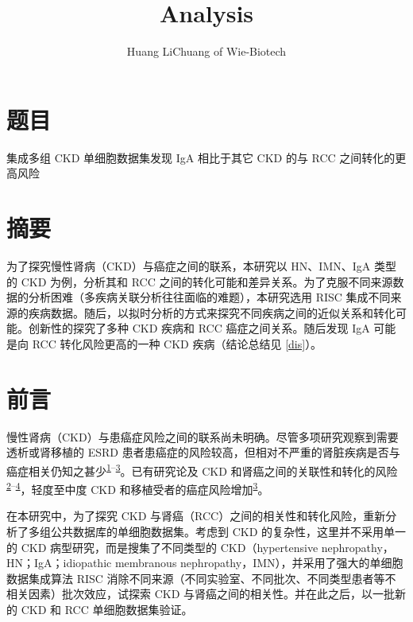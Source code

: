 \documentclass[
]{article}
\title{Analysis}
\author{Huang LiChuang of Wie-Biotech}
\date{}
\begin{document}
\maketitle

{
\setcounter{tocdepth}{4}
\tableofcontents
}
\listoffigures

\listoftables

\hypertarget{ux9898ux76ee}{%
\section{题目}\label{ux9898ux76ee}}

集成多组 CKD 单细胞数据集发现 IgA 相比于其它 CKD 的与 RCC 之间转化的更高风险

\hypertarget{abstract}{%
\section{摘要}\label{abstract}}

为了探究慢性肾病（CKD）与癌症之间的联系，本研究以 HN、IMN、IgA 类型的 CKD 为例，分析其和 RCC 之间的转化可能和差异关系。为了克服不同来源数据的分析困难（多疾病关联分析往往面临的难题），本研究选用 RISC 集成不同来源的疾病数据。随后，以拟时分析的方式来探究不同疾病之间的近似关系和转化可能。创新性的探究了多种 CKD 疾病和 RCC 癌症之间关系。随后发现 IgA 可能是向 RCC 转化风险更高的一种 CKD 疾病（结论总结见 \ref{dis}）。

\hypertarget{introduction}{%
\section{前言}\label{introduction}}

慢性肾病（CKD）与患癌症风险之间的联系尚未明确。尽管多项研究观察到需要透析或肾移植的 ESRD 患者患癌症的风险较高，但相对不严重的肾脏疾病是否与癌症相关仍知之甚少\textsuperscript{\protect\hyperlink{ref-OnconephrologyRosner2021}{1}--\protect\hyperlink{ref-CancerRiskAndKitchl2022}{3}}。已有研究论及 CKD 和肾癌之间的关联性和转化的风险\textsuperscript{\protect\hyperlink{ref-CkdAndTheRisLowran2014}{2}--\protect\hyperlink{ref-RenalCellCancSaly2021}{4}}，轻度至中度 CKD 和移植受者的癌症风险增加\textsuperscript{\protect\hyperlink{ref-CancerRiskAndKitchl2022}{3}}。

在本研究中，为了探究 CKD 与肾癌（RCC）之间的相关性和转化风险，重新分析了多组公共数据库的单细胞数据集。考虑到 CKD 的复杂性，这里并不采用单一的 CKD 病型研究，而是搜集了不同类型的 CKD（hypertensive nephropathy，HN；IgA；idiopathic membranous nephropathy，IMN），并采用了强大的单细胞数据集成算法 RISC 消除不同来源（不同实验室、不同批次、不同类型患者等不相关因素）批次效应，试探索 CKD 与肾癌之间的相关性。并在此之后，以一批新的 CKD 和 RCC 单细胞数据集验证。
\end{document}
